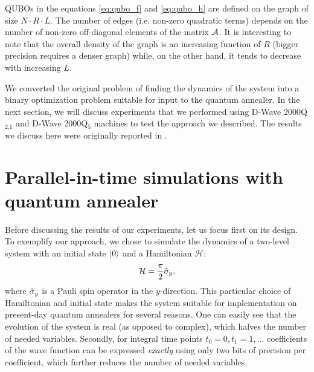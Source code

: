 QUBOs in the equations \eqref{eq:qubo_f} and \eqref{eq:qubo_h} are defined on
the graph of size $N \cdot R \cdot L$. The number of edges (i.e. non-zero
quadratic terms) depends on the number of non-zero off-diagonal elements of the
matrix $\mathcal{A}$. It is interesting to note that the overall density of the
graph is an increasing function of $R$ (bigger precision requires a denser
graph) while, on the other hand, it tends to decrease with increasing $L$.

We converted the original problem of finding the dynamics of the system into a
binary optimization problem suitable for input to the quantum annealer. In the
next section, we will discuss experiments that we performed using D-Wave
2000Q$_{2.1}$ and D-Wave 2000Q$_5$ machines to test the approach we described.
The results we discuss here were originally reported in \cite{parallelintime}.

\section{Parallel-in-time simulations with quantum annealer}
\label{sec:parallel-in-time}
Before discussing the results of our experiments, let us focus first on its
design. To exemplify our approach, we chose to simulate the dynamics of a
two-level system with an initial state $\ket{0}$ and a Hamiltonian $\mathcal{H}$:
\begin{equation}
  \mathcal{H} = \frac{\pi}{2}\hat{\sigma}_y,
\end{equation}
where $\hat{\sigma}_y$ is a Pauli spin operator in the $y$-direction. This particular
choice of Hamiltonian and initial state makes the system suitable for
implementation on present-day quantum annealers for several reasons. One can
easily see that the evolution of the system is real (as opposed to complex),
which halves the number of needed variables. Secondly, for integral time points
$t_0=0, t_1=1, \ldots$ coefficients of the wave function can be expressed
\emph{exactly} using only two bits of precision per coefficient, which further
reduces the number of needed variables.

